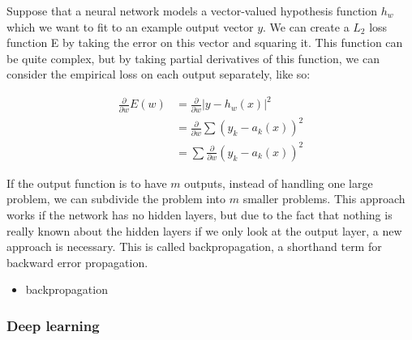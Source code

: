 Suppose that a neural network models a vector-valued hypothesis
function $h_w$ which we want to fit to an example output vector
$y$. We can create a $L_2$ loss function E by taking the error on this
vector and squaring it. This function can be quite complex, but by
taking partial derivatives of this function, we can consider the
empirical loss on each output separately, like so:

\begin{equation}
  \begin{aligned} 
    \frac{\partial}{\partial w} E(w) &= \frac{\partial}{\partial w} \lvert y - h_w(x) \rvert^2 \\
    &= \frac{\partial}{\partial w} \sum (y_k - a_k(x))^2 \\
    &=  \sum \frac{\partial}{\partial w} (y_k - a_k(x))^2
  \end{aligned} 
\end{equation}

If the output function is to have $m$ outputs, instead of handling one
large problem, we can subdivide the problem into $m$ smaller
problems. This approach works if the network has no hidden layers, but
due to the fact that nothing is really known about the hidden layers
if we only look at the output layer, a new approach is necessary. This
is called backpropagation, a shorthand term for backward error
propagation.
\begin{itemize}
\item backpropagation
\end{itemize}

\subsubsection{Deep learning}
\label{sec:neuralnetworks}



